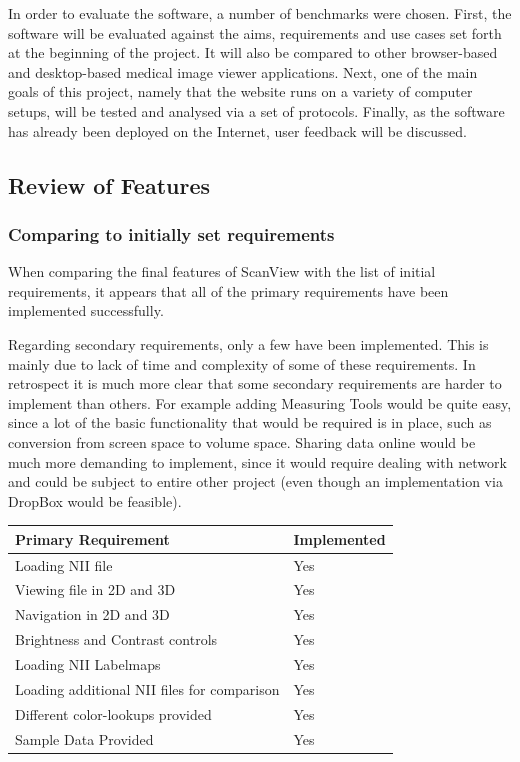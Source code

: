\documentclass[a4paper,11pt,twoside]{article}
\begin{document}
In order to evaluate the software, a number of benchmarks were chosen. First, the software will be evaluated against the aims, requirements and use cases set forth at the beginning of the project. It will also be compared to other browser-based and desktop-based medical image viewer applications. Next, one of the main goals of this project, namely that the website runs on a variety of computer setups, will be tested and analysed via a set of protocols. Finally, as the software has already been deployed on the Internet, user feedback will be discussed.


\subsection{Review of Features}

\subsubsection{Comparing to initially set requirements}

When comparing the final features of ScanView with the list of initial requirements, it appears that all of the primary requirements have been implemented successfully.


Regarding secondary requirements, only a few have been implemented. This is mainly due to lack of time and complexity of some of these requirements. In retrospect it is much more clear that some secondary requirements are harder to implement than others. For example adding Measuring Tools would be quite easy, since a lot of the basic functionality that would be required is in place, such as conversion from screen space to volume space. Sharing data online would be much more demanding to implement, since it would require dealing with network and could be subject to entire other project (even though an implementation via DropBox would be feasible).



\begin{center}

  \begin{tabular}{| l | l |}
    \hline
    Primary Requirement & Implemented \\ \hline \hline
	Loading NII file & Yes\\ \hline
	Viewing file in 2D and 3D & Yes\\ \hline
	Navigation in 2D and 3D & Yes\\ \hline
	Brightness and Contrast controls & Yes \\ \hline
	Loading NII Labelmaps & Yes \\ \hline
	Loading additional NII files for comparison & Yes \\ \hline
	Different color-lookups provided & Yes \\ \hline
	Sample Data Provided & Yes \\ \hline

  \end{tabular}\\
\end{center}
\end{document}
